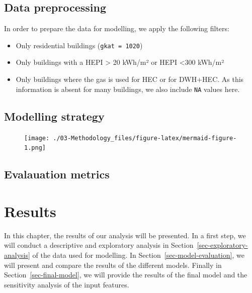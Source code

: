 \documentclass[
  letterpaper,
  DIV=11,
  numbers=noendperiod]{scrreprt}
\providecommand{\tightlist}{%
  \setlength{\itemsep}{0pt}\setlength{\parskip}{0pt}}\usepackage{longtable,booktabs,array}
\begin{document}
\hypertarget{sec-data-preprocessing}{%
\section{Data preprocessing}\label{sec-data-preprocessing}}

In order to prepare the data for modelling, we apply the following
filters:

\begin{itemize}
\tightlist
\item
  Only residential buildings (\texttt{gkat\ =\ 1020})
\item
  Only buildings with a HEPI \textgreater{} 20 kWh/m² or HEPI
  \textless300 kWh/m²
\item
  Only buildings where the gas is used for HEC or for DWH+HEC. As this
  information is absent for many buildings, we also include \texttt{NA}
  values here.
\end{itemize}

\hypertarget{modelling-strategy}{%
\section{Modelling strategy}\label{modelling-strategy}}

\begin{figure}[H]

{\centering \texttt{[image: ./03-Methodology\_files/figure-latex/mermaid-figure-1.png]}

}

\end{figure}

\hypertarget{evaluation-metrics}{%
\section{Evalauation metrics}\label{evaluation-metrics}}


\hypertarget{sec-results}{%
\chapter{Results}\label{sec-results}}

In this chapter, the results of our analysis will be presented. In a
first step, we will conduct a descriptive and exploratory analysis in
Section~\ref{sec-exploratory-analysis} of the data used for modelling.
In Section~\ref{sec-model-evaluation}, we will present and compare the
results of the different models. Finally in
Section~\ref{sec-final-model}, we will provide the results of the final
model and the sensitivity analysis of the input features.
\end{document}
